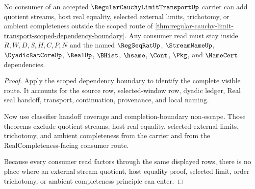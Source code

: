 \begin{theorem}
\label{thm:regular-cauchy-limit-transport-visible-scope-exhaustion}
No consumer of an accepted $\RegularCauchyLimitTransportUp$ carrier can add quotient streams, host real equality, selected external limits, trichotomy, or ambient completeness outside the scoped route of \autoref{thm:regular-cauchy-limit-transport-scoped-dependency-boundary}. Any consumer read must stay inside $R,W,D,S,H,C,P,N$ and the named $\RegSeqRatUp$, $\StreamNameUp$, $\DyadicRatCoreUp$, $\RealUp$, $\BHist$, $\hsame$, $\Cont$, $\Pkg$, and $\NameCert$ dependencies.
\end{theorem}
\begin{proof}
Apply the scoped dependency boundary to identify the complete visible route. It accounts for the source row, selected-window row, dyadic ledger, Real seal handoff, transport, continuation, provenance, and local naming.

Now use classifier handoff coverage and completion-boundary non-escape. Those theorems exclude quotient streams, host real equality, selected external limits, trichotomy, and ambient completeness from the carrier and from the RealCompleteness-facing consumer route.

Because every consumer read factors through the same displayed rows, there is no place where an external stream quotient, host equality proof, selected limit, order trichotomy, or ambient completeness principle can enter.
\end{proof}

